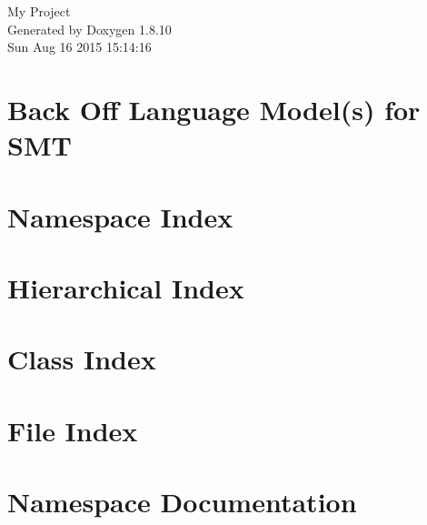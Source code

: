 \documentclass[twoside]{book}
\newcommand{\+}{\discretionary{\mbox{\scriptsize$\hookleftarrow$}}{}{}}
\newcommand{\clearemptydoublepage}{%
  \newpage{\pagestyle{empty}\cleardoublepage}%
}
\begin{document}
\hypersetup{pageanchor=false,
             bookmarks=true,
             bookmarksnumbered=true,
             pdfencoding=unicode
            }
\begin{titlepage}
\vspace*{7cm}
\begin{center}%
{\Large My Project }\\
\vspace*{1cm}
{\large Generated by Doxygen 1.8.10}\\
\vspace*{0.5cm}
{\small Sun Aug 16 2015 15:14:16}\\
\end{center}
\end{titlepage}
\clearemptydoublepage
\tableofcontents
\clearemptydoublepage
{}
\hypersetup{pageanchor=true}

\chapter{Back Off Language Model(s) for S\+M\+T}
\label{md__r_e_a_d_m_e}
\hypertarget{md__r_e_a_d_m_e}{}

\chapter{Namespace Index}

\chapter{Hierarchical Index}

\chapter{Class Index}

\chapter{File Index}

\chapter{Namespace Documentation}













\end{document}

